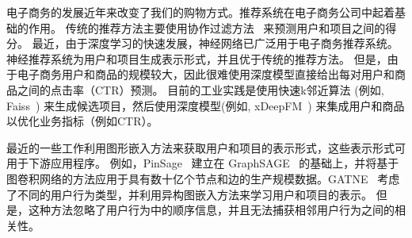
电子商务的发展近年来改变了我们的购物方式。推荐系统在电子商务公司中起着基础的作用。
传统的推荐方法主要使用协作过滤方法~\cite{sarwar2001item,schafer2007collaborative} 来预测用户和项目之间的得分。 最近，由于深度学习的快速发展，神经网络已广泛用于电子商务推荐系统。 神经推荐系统为用户和项目生成表示形式，并且优于传统的推荐方法。 但是，由于电子商务用户和商品的规模较大，因此很难使用深度模型直接给出每对用户和商品之间的点击率（CTR）预测。 目前的工业实践是使用快速k邻近算法 (例如, Faiss~\cite{JDH17}) 来生成候选项目，然后使用深度模型(例如, xDeepFM~\cite{lian2018xdeepfm}) 来集成用户和商品以优化业务指标（例如CTR）。


最近的一些工作利用图形嵌入方法来获取用户和项目的表示形式，这些表示形式可用于下游应用程序。 例如，PinSage~\cite{ying2018graph} 建立在 GraphSAGE~\cite{hamilton2017inductive} 的基础上，并将基于图卷积网络的方法应用于具有数十亿个节点和边的生产规模数据。GATNE~\cite{cen2019representation} 考虑了不同的用户行为类型，并利用异构图嵌入方法来学习用户和项目的表示。 但是，这种方法忽略了用户行为中的顺序信息，并且无法捕获相邻用户行为之间的相关性。 %


